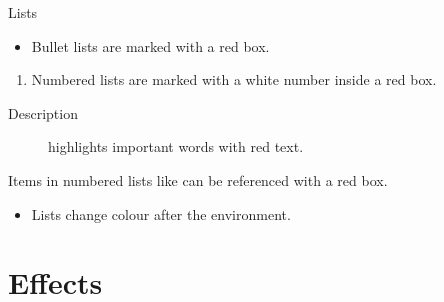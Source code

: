 \documentclass[UKenglish]{beamer}
\begin{document}
\begin{frame}{Lists}
    \begin{itemize}
        \item
              Bullet lists are marked with a red box.
    \end{itemize}

    \begin{enumerate}
        \item
              \label{enum:item}
              Numbered lists are marked with a white number inside a red box.
    \end{enumerate}

    \begin{description}
        \item[Description] highlights important words with red text.
    \end{description}

    Items in numbered lists like  can be referenced with a
    red box.

    \begin{example}
        \begin{itemize}
            \item
                  Lists change colour after the environment.
        \end{itemize}
    \end{example}
\end{frame}

\section{Effects}
\end{document}
